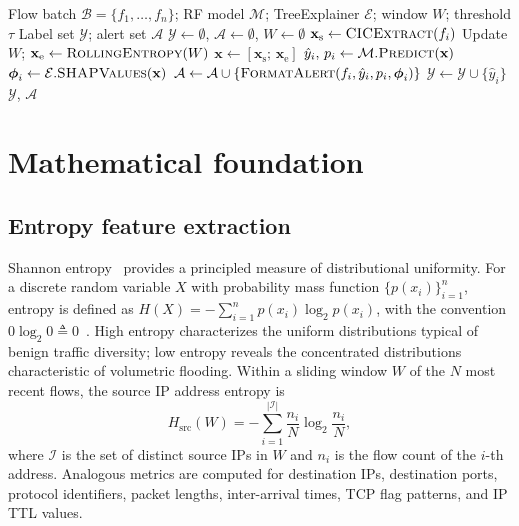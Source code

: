 ﻿\documentclass[review,12pt]{elsarticle}
\begin{document}
\begin{algorithm}[!t]
\caption{XAI-SDN real-time detection and explanation}
\label{alg:xaisdn}
\begin{algorithmic}[1]
\Require Flow batch $\mathcal{B}=\{f_1,\ldots,f_n\}$; RF model $\mathcal{M}$; TreeExplainer $\mathcal{E}$; window $W$; threshold $\tau$
\Ensure Label set $\mathcal{Y}$; alert set $\mathcal{A}$
\State $\mathcal{Y}\leftarrow\emptyset$,\; $\mathcal{A}\leftarrow\emptyset$,\; $W\leftarrow\emptyset$
\State $\mathbf{x}_{\mathrm{s}} \leftarrow \textsc{CICExtract}(f_i)$ 
\State Update $W$;\; $\mathbf{x}_{\mathrm{e}} \leftarrow \textsc{RollingEntropy}(W)$ 
\State $\mathbf{x} \leftarrow [\mathbf{x}_{\mathrm{s}};\, \mathbf{x}_{\mathrm{e}}]$ 
\State $\hat{y}_i,\, p_i \leftarrow \mathcal{M}.\textsc{Predict}(\mathbf{x})$ 
\State $\boldsymbol{\phi}_i \leftarrow \mathcal{E}.\textsc{SHAPValues}(\mathbf{x})$ 
\State $\mathcal{A}\leftarrow\mathcal{A}\cup\{\textsc{FormatAlert}(f_i,\hat{y}_i,p_i,\boldsymbol{\phi}_i)\}$
\EndIf
\State $\mathcal{Y}\leftarrow\mathcal{Y}\cup\{\hat{y}_i\}$
\EndFor
\State \Return $\mathcal{Y}$,\; $\mathcal{A}$
\end{algorithmic}
\end{algorithm}

\section{Mathematical foundation}
\label{sec:math}

\subsection{Entropy feature extraction}
Shannon entropy~\cite{shannon1948mathematical} provides a principled measure of distributional uniformity. For a discrete random variable $X$ with probability mass function $\{p(x_i)\}_{i=1}^{n}$, entropy is defined as $H(X) = -\sum_{i=1}^{n} p(x_i) \log_2 p(x_i)$, with the convention $0\log_2 0 \triangleq 0$~\cite{nychis2008entropy}. High entropy characterizes the uniform distributions typical of benign traffic diversity; low entropy reveals the concentrated distributions characteristic of volumetric flooding. Within a sliding window $W$ of the $N$ most recent flows, the source IP address entropy is
\begin{equation}
H_{\mathrm{src}}(W) = -\sum_{i=1}^{|\mathcal{I}|} \frac{n_i}{N} \log_2 \frac{n_i}{N},
\label{eq:srcip}
\end{equation}
where $\mathcal{I}$ is the set of distinct source IPs in $W$ and $n_i$ is the flow count of the $i$-th address. Analogous metrics are computed for destination IPs, destination ports, protocol identifiers, packet lengths, inter-arrival times, TCP flag patterns, and IP TTL values.
\end{document}
